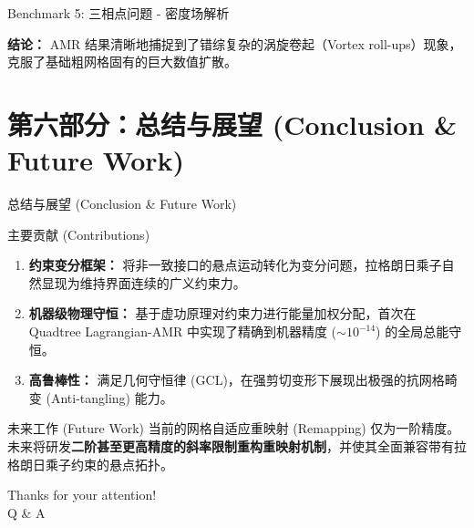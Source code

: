 \documentclass{beamer}
\begin{document}
	\begin{frame}{Benchmark 5: 三相点问题 - 密度场解析}
		\begin{figure}[htpb]
			\centering
		\end{figure}
		\textbf{结论：} AMR 结果清晰地捕捉到了错综复杂的涡旋卷起（Vortex roll-ups）现象，克服了基础粗网格固有的巨大数值扩散。
	\end{frame}
	
	\section{第六部分：总结与展望 (Conclusion \& Future Work)}
	
	\begin{frame}{总结与展望 (Conclusion \& Future Work)}
		\begin{block}{主要贡献 (Contributions)}
			\begin{enumerate}
				\item \textbf{约束变分框架：} 将非一致接口的悬点运动转化为变分问题，拉格朗日乘子自然显现为维持界面连续的广义约束力。
				\item \textbf{机器级物理守恒：} 基于虚功原理对约束力进行能量加权分配，首次在 Quadtree Lagrangian-AMR 中实现了精确到机器精度 ($\sim 10^{-14}$) 的全局总能守恒。
				\item \textbf{高鲁棒性：} 满足几何守恒律 (GCL)，在强剪切变形下展现出极强的抗网格畸变 (Anti-tangling) 能力。
			\end{enumerate}
		\end{block}
		
		\vspace{0.2cm}
		\begin{exampleblock}{未来工作 (Future Work)}
			当前的网格自适应重映射 (Remapping) 仅为一阶精度。未来将研发\textbf{二阶甚至更高精度的斜率限制重构重映射机制}，并使其全面兼容带有拉格朗日乘子约束的悬点拓扑。
		\end{exampleblock}
	\end{frame}
	
	\begin{frame}
		\begin{center}
			{\Huge\calligra Thanks for your attention!} \\
			\vspace{1cm}
			\Large Q \& A
		\end{center}
	\end{frame}
	
\end{document}
